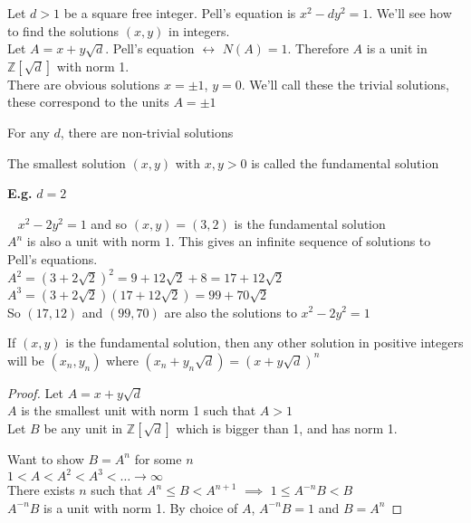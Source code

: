 \documentclass[11pt]{article}
\begin{document}
Let $d > 1$ be a square free integer. Pell's equation is $x^2 - dy^2=1 $. We'll see how to find the solutions $(x,y)$ in integers.\\[1em]
Let $A = x+y\sqrt{d}$. Pell's equation $\leftrightarrow $ $N(A)=1$. Therefore $A$ is a unit in $\mathbb{Z}[\sqrt{d}]$ with norm 1. \\[1em]
There are obvious solutions $x= \pm 1$, $ y= 0$. We'll call these the trivial solutions, these correspond to the units $A= \pm 1$

\begin{theorem}
For any $d$, there are non-trivial solutions
\end{theorem}

\begin{definition}
	The smallest solution $(x,y)$ with $x,y >0$ is called the fundamental solution
\end{definition}
$ $\\
\textbf{E.g.} $d = 2$ 

$\hspace{10pt}x^2-2y^2 = 1$ and so $(x,y) = (3,2)$  is the fundamental solution\\[2em]
$A^n$ is also a unit with norm $1$. This gives an infinite sequence of solutions to Pell's equations.\\[0.5em]
$A^2 = (3+2\sqrt{2})^2 = 9+12\sqrt{2} + 8 = 17+12\sqrt{2}$\\
$A^3 = (3+2\sqrt{2})(17+12\sqrt{2}) = 99 + 70\sqrt{2}$\\[1em]
So $(17,12) $ and $(99,70)$ are also the solutions to $x^2 -2y^2 = 1$


\begin{proposition}
	If $(x,y)$ is the fundamental solution, then any other solution in positive integers will be $(x_n,y_n)$ where $(x_n + y_n \sqrt{d}) = (x+y\sqrt{d})^n$
\end{proposition}


\begin{proof}
	Let $A = x+y\sqrt{d}$\\
	
	$A$ is the smallest unit with norm 1 such that $A>1$\\

	Let $B$ be any unit in $\mathbb{Z}[\sqrt{d}] $ which is bigger than 1, and has norm 1. 
	
	Want to show $B= A^n $ for some $n$\\

	$1<A<A^2<A^3<\dots \rightarrow \infty$\\
	
	There exists $n$ such that $A^n \leq B < A^{n+1}$ $\implies $ $ 1 \leq A^{-n}B < B$\\

	$A^{-n}B$ is a unit with norm 1. By choice of $A$, $A^{-n}B=1$ and $B=A^n$ 
\end{proof}
\end{document}
